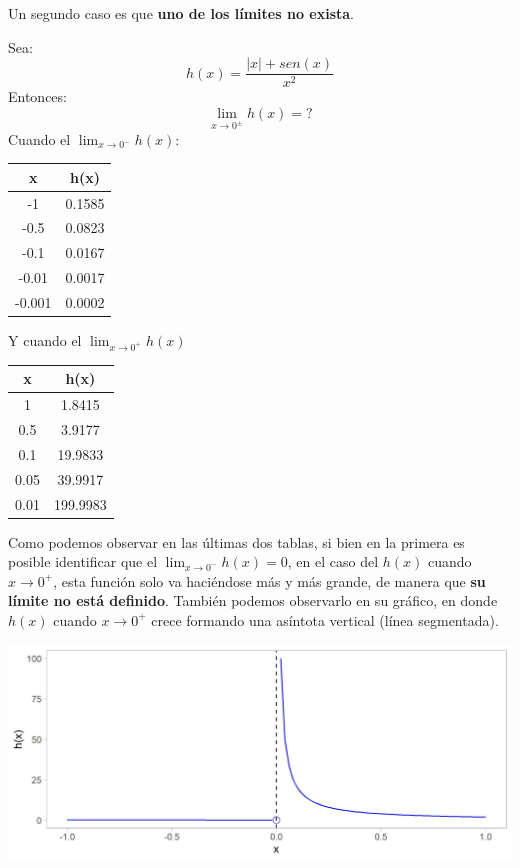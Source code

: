 \documentclass[12pt]{article}
\begin{document}
Un segundo caso es que \textbf{uno de los límites no exista}.

Sea:
\[h(x) = \frac{|x| + sen(x)}{x^{2}}\]
Entonces:
\[\lim_{x \to 0^{\pm}}h(x)=?\]
Cuando el $\lim_{x \to 0^{-}}h(x)$:

\begin{center}

\begin{tabular}{c | c}

x & h(x)\\
\hline
-1 & 0.1585\\
-0.5 & 0.0823\\
-0.1 & 0.0167\\
-0.01 & 0.0017\\
-0.001 & 0.0002\\

\end{tabular}

\end{center}

Y cuando el $\lim_{x \to 0^{+}}h(x)$

\begin{center}

\begin{tabular}{c | c}

x & h(x)\\
\hline
1 & 1.8415\\
0.5 & 3.9177\\
0.1 & 19.9833\\
0.05 & 39.9917\\
0.01 & 199.9983\\

\end{tabular}

\end{center}

Como podemos observar en las últimas dos tablas, si bien en la primera es posible identificar que el $\lim_{x \to 0^{-}} h(x) = 0$, en el caso del $h(x)$ cuando $x \to 0^{+}$, esta función solo va haciéndose más y más grande, de manera que \textbf{su límite no está definido}. También podemos observarlo en su gráfico, en donde $h(x)$ cuando $x \to 0^{+}$ crece formando una asíntota vertical (línea segmentada).

\includegraphics[scale=0.7]{img/limit_plot_h.jpg}
\end{document}
